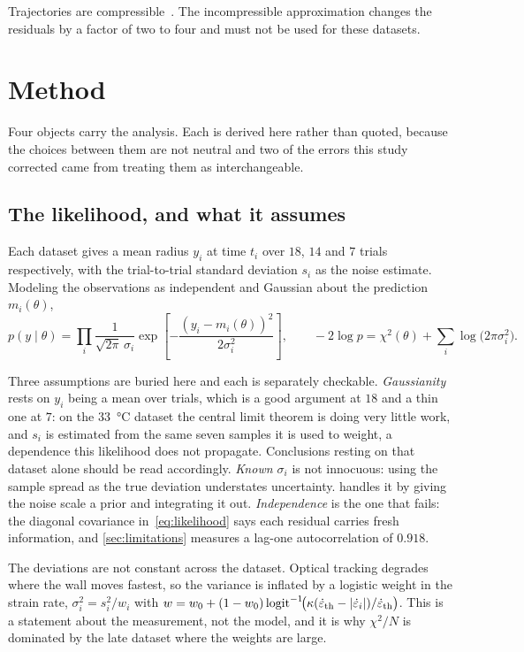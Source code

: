 \documentclass[10pt]{article}
\begin{document}
Trajectories are compressible~\citep{keller1980bubble}. The incompressible approximation
changes the residuals by a factor of two to four and must not be used for these datasets.

\section{Method}

Four objects carry the analysis. Each is derived here rather than quoted, because the
choices between them are not neutral and two of the errors this study corrected came from
treating them as interchangeable.

\subsection{The likelihood, and what it assumes}

Each dataset gives a mean radius $y_i$ at time $t_i$ over $18$, $14$ and $7$ trials
respectively, with the trial-to-trial standard deviation $s_i$ as the noise estimate. Modeling the observations
as independent and Gaussian about the prediction $m_i(\theta)$,
%
\begin{equation}
p(y \mid \theta) = \prod_i \frac{1}{\sqrt{2\pi}\,\sigma_i}
  \exp\!\left[-\frac{(y_i - m_i(\theta))^2}{2\sigma_i^2}\right],
\qquad
-2\log p = \chi^2(\theta) + \sum_i \log\!\big(2\pi\sigma_i^2\big).
\label{eq:likelihood}
\end{equation}

Three assumptions are buried here and each is separately checkable. \emph{Gaussianity} rests
on $y_i$ being a mean over trials, which is a good argument at $18$ and a thin one at $7$: on
the \SI{33}{\celsius} dataset the central limit theorem is doing very little work, and $s_i$ is
estimated from the same seven samples it is used to weight, a dependence this likelihood does
not propagate. Conclusions resting on that dataset alone should be read accordingly.
\emph{Known $\sigma_i$} is not innocuous: using the sample spread as the true deviation
understates uncertainty.  handles it by giving the noise scale a prior and
integrating it out. \emph{Independence} is the one that fails: the
diagonal covariance in~\eqref{eq:likelihood} says each residual carries fresh information,
and \cref{sec:limitations} measures a lag-one autocorrelation of $0.918$.

The deviations are not constant across the dataset. Optical tracking degrades where the wall
moves fastest, so the variance is inflated by a logistic weight in the strain rate,
$\sigma_i^2 = s_i^2/w_i$ with
$w = w_0 + (1-w_0)\,\mathrm{logit}^{-1}\!\big(\kappa(\dot\varepsilon_{\rm th} -
|\dot\varepsilon_i|)/\dot\varepsilon_{\rm th}\big)$. This is a statement about the
measurement, not the model, and it is why $\chi^2/N$ is dominated by the late dataset where
the weights are large.
\end{document}
